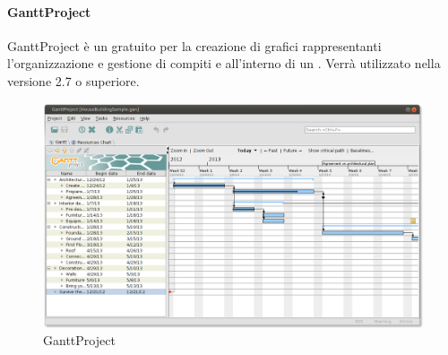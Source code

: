  \paragraph{GanttProject} 
 GanttProject è un  gratuito per la creazione di grafici rappresentanti l'organizzazione e gestione di compiti e  all'interno di un . Verrà utilizzato nella versione 2.7 o superiore.
\begin{figure}[h]
\centering
\includegraphics[scale=0.35]{img/gantt.png}
\caption{GanttProject}\label{sec:Figura6}
\end{figure} 
 